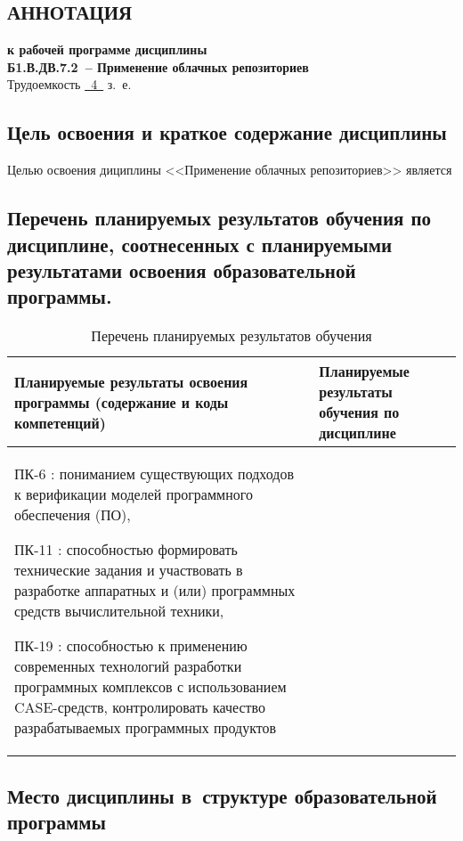 \documentclass[a4paper,12pt]{article}
\begin{document}
\newpage


\begin{center}
\section{АННОТАЦИЯ}
{\bf к рабочей программе дисциплины\\
Б1.В.ДВ.7.2\ -- Применение облачных репозиториев} \\
Трудоемкость \uline{~4~} з.~е.
\end{center}


\subsection{Цель освоения и краткое содержание дисциплины}
Целью освоения дициплины <<Применение облачных репозиториев>> является


\subsection{Перечень планируемых результатов обучения по дисциплине, соотнесенных с планируемыми результатами освоения образовательной программы.}
\begin{longtable}{|p{8cm}|p{8cm}|}
\caption{Перечень планируемых результатов обучения}\\
\hline
\centering
Планируемые результаты освоения программы (содержание и коды компетенций) & 
\centering\arraybackslash
Планируемые результаты обучения по дисциплине
\\
\hline

ПК-6 : пониманием существующих подходов к верификации моделей программного обеспечения (ПО), 

ПК-11 : способностью формировать технические задания и участвовать в разработке аппаратных и (или) программных средств вычислительной техники, 

ПК-19 : способностью к применению современных технологий разработки программных комплексов с использованием CASE-средств, контролировать качество разрабатываемых программных продуктов

& \\
\hline
\end{longtable}


\subsection{Место дисциплины в~структуре образовательной программы}
\end{document}
